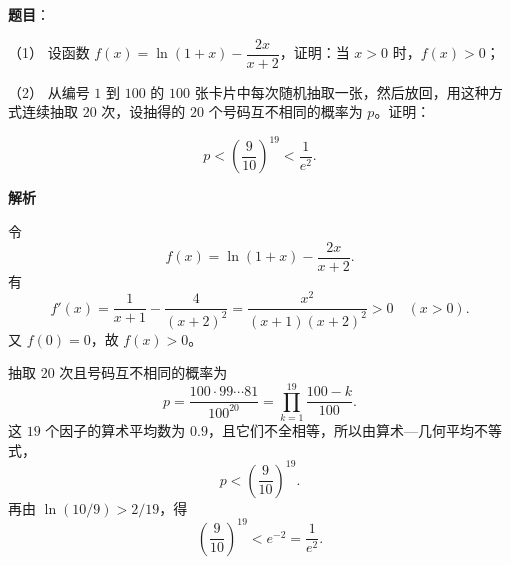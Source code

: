 \begin{answer}

\textbf{题目}：

（1） 设函数 $f(x)=\ln(1+x)-\dfrac{2x}{x+2}$，证明：当 $x>0$ 时，$f(x)>0$；

（2） 从编号 $1$ 到 $100$ 的 $100$ 张卡片中每次随机抽取一张，然后放回，用这种方式连续抽取 $20$ 次，设抽得的 $20$ 个号码互不相同的概率为 $p$。证明：

\nopagebreak[4]
\[
p<\left(\frac9{10}\right)^{19}<\frac1{e^2}.
\]

\textbf{解析}


令
\nopagebreak[4]
\[
f(x)=\ln(1+x)-\frac{2x}{x+2}.
\]
有
\nopagebreak[4]
\[
f'(x)=\frac1{x+1}-\frac4{(x+2)^2}
=\frac{x^2}{(x+1)(x+2)^2}>0\quad(x>0).
\]
又 $f(0)=0$，故 $f(x)>0$。


抽取 $20$ 次且号码互不相同的概率为
\nopagebreak[4]
\[
p=\frac{100\cdot99\cdots81}{100^{20}}
=\prod_{k=1}^{19}\frac{100-k}{100}.
\]
这 $19$ 个因子的算术平均数为 $0.9$，且它们不全相等，所以由算术—几何平均不等式，
\nopagebreak[4]
\[
p<\left(\frac9{10}\right)^{19}.
\]
再由 $\ln(10/9)>2/19$，得
\nopagebreak[4]
\[
\left(\frac9{10}\right)^{19}<e^{-2}=\frac1{e^2}.
\]



\end{answer}